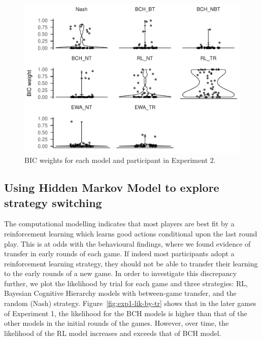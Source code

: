 \documentclass[man,floatsintext]{apa6}
\begin{document}
\begin{figure}

{\centering \includegraphics[width=\textwidth]{paper_draft_2021_files/figure-latex/xp2-BIC-weigths-1} 

}

\caption{BIC weights for each model and participant in Experiment 2.}\label{fig:xp2-BIC-weigths}
\end{figure}

\hypertarget{using-hidden-markov-model-to-explore-strategy-switching}{%
\subsection{Using Hidden Markov Model to explore strategy switching}\label{using-hidden-markov-model-to-explore-strategy-switching}}

The computational modelling indicates that most players are best fit by a reinforcement learning which learns good actions conditional upon the last round play. This is at odds with the behavioural findings, where we found evidence of transfer in early rounds of each game. If indeed most participants adopt a reinforcement learning strategy, they should not be able to transfer their learning to the early rounds of a new game. In order to investigate this discrepancy further, we plot the likelihood by trial for each game and three strategies: RL, Bayesian Cognitive Hierarchy models with between-game transfer, and the random (Nash) strategy. Figure~\ref{fig:exp1-lik-by-tr} shows that in the later games of Experiment 1, the likelihood for the BCH models is higher than that of the other models in the initial rounds of the games. However, over time, the likelihood of the RL model increases and exceeds that of BCH model.
\end{document}
